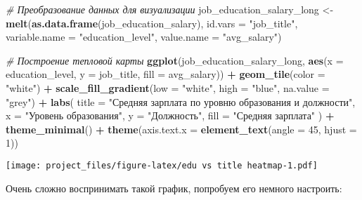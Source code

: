 \documentclass[
]{article}
\newenvironment{Shaded}{\begin{snugshade}}{\end{snugshade}}
\newcommand{\AttributeTok}[1]{\textcolor[rgb]{0.13,0.29,0.53}{#1}}
\newcommand{\CommentTok}[1]{\textcolor[rgb]{0.56,0.35,0.01}{\textit{#1}}}
\newcommand{\DecValTok}[1]{\textcolor[rgb]{0.00,0.00,0.81}{#1}}
\newcommand{\FunctionTok}[1]{\textcolor[rgb]{0.13,0.29,0.53}{\textbf{#1}}}
\newcommand{\NormalTok}[1]{#1}
\newcommand{\OtherTok}[1]{\textcolor[rgb]{0.56,0.35,0.01}{#1}}
\newcommand{\SpecialCharTok}[1]{\textcolor[rgb]{0.81,0.36,0.00}{\textbf{#1}}}
\newcommand{\StringTok}[1]{\textcolor[rgb]{0.31,0.60,0.02}{#1}}
\begin{document}
\begin{Shaded}
\begin{Highlighting}[]
\CommentTok{\# Преобразование данных для визуализации}
\NormalTok{job\_education\_salary\_long }\OtherTok{\textless{}{-}} \FunctionTok{melt}\NormalTok{(}\FunctionTok{as.data.frame}\NormalTok{(job\_education\_salary), }\AttributeTok{id.vars =} \StringTok{"job\_title"}\NormalTok{, }\AttributeTok{variable.name =} \StringTok{"education\_level"}\NormalTok{, }\AttributeTok{value.name =} \StringTok{"avg\_salary"}\NormalTok{)}

\CommentTok{\# Построение тепловой карты}
\FunctionTok{ggplot}\NormalTok{(job\_education\_salary\_long, }\FunctionTok{aes}\NormalTok{(}\AttributeTok{x =}\NormalTok{ education\_level, }\AttributeTok{y =}\NormalTok{ job\_title, }\AttributeTok{fill =}\NormalTok{ avg\_salary)) }\SpecialCharTok{+}
  \FunctionTok{geom\_tile}\NormalTok{(}\AttributeTok{color =} \StringTok{"white"}\NormalTok{) }\SpecialCharTok{+}
  \FunctionTok{scale\_fill\_gradient}\NormalTok{(}\AttributeTok{low =} \StringTok{"white"}\NormalTok{, }\AttributeTok{high =} \StringTok{"blue"}\NormalTok{, }\AttributeTok{na.value =} \StringTok{"grey"}\NormalTok{) }\SpecialCharTok{+}
  \FunctionTok{labs}\NormalTok{(}
    \AttributeTok{title =} \StringTok{"Средняя зарплата по уровню образования и должности"}\NormalTok{,}
    \AttributeTok{x =} \StringTok{"Уровень образования"}\NormalTok{,}
    \AttributeTok{y =} \StringTok{"Должность"}\NormalTok{,}
    \AttributeTok{fill =} \StringTok{"Средняя зарплата"}
\NormalTok{  ) }\SpecialCharTok{+}
  \FunctionTok{theme\_minimal}\NormalTok{() }\SpecialCharTok{+}
  \FunctionTok{theme}\NormalTok{(}\AttributeTok{axis.text.x =} \FunctionTok{element\_text}\NormalTok{(}\AttributeTok{angle =} \DecValTok{45}\NormalTok{, }\AttributeTok{hjust =} \DecValTok{1}\NormalTok{))}
\end{Highlighting}
\end{Shaded}

\texttt{[image: project\_files/figure-latex/edu vs title heatmap-1.pdf]}

Очень сложно воспринимать такой график, попробуем его немного настроить:
\end{document}
